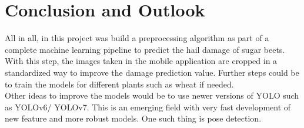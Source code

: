 
\chapter{Conclusion and Outlook}
All in all, in this project was build a preprocessing algorithm as part of a complete machine learning pipeline to predict the hail damage of sugar beets. With this step, the images taken in the mobile application are cropped in a standardized way to improve the damage prediction value. Further steps could be to train the models for different plants such as wheat if needed. \\

Other ideas to improve the models would be to use newer versions of YOLO such as YOLOv6/ YOLOv7. This is an emerging field with very fast development of new feature and more robust models. One such thing is pose detection.